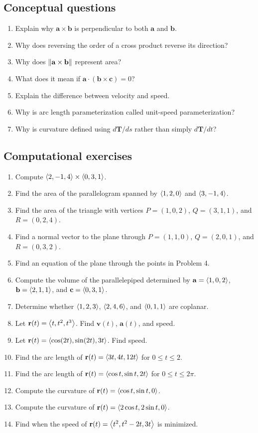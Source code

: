 \subsection*{Conceptual questions}
\begin{enumerate}
\item Explain why $\mathbf a\times\mathbf b$ is perpendicular to both $\mathbf a$ and $\mathbf b$.
\item Why does reversing the order of a cross product reverse its direction?
\item Why does $\left\lVert \mathbf a\times\mathbf b\right\rVert$ represent area?
\item What does it mean if $\mathbf a\cdot(\mathbf b\times\mathbf c)=0$?
\item Explain the difference between velocity and speed.
\item Why is arc length parameterization called unit-speed parameterization?
\item Why is curvature defined using $d\mathbf T/ds$ rather than simply $d\mathbf T/dt$?
\end{enumerate}

\subsection*{Computational exercises}
\begin{enumerate}
\item Compute $\left\langle 2,-1,4\right\rangle\times\left\langle 0,3,1\right\rangle$.
\item Find the area of the parallelogram spanned by $\left\langle 1,2,0\right\rangle$ and $\left\langle 3,-1,4\right\rangle$.
\item Find the area of the triangle with vertices $P=(1,0,2)$, $Q=(3,1,1)$, and $R=(0,2,4)$.
\item Find a normal vector to the plane through $P=(1,1,0)$, $Q=(2,0,1)$, and $R=(0,3,2)$.
\item Find an equation of the plane through the points in Problem 4.
\item Compute the volume of the parallelepiped determined by $\mathbf a=\left\langle 1,0,2\right\rangle$, $\mathbf b=\left\langle 2,1,1\right\rangle$, and $\mathbf c=\left\langle 0,3,1\right\rangle$.
\item Determine whether $\left\langle 1,2,3\right\rangle$, $\left\langle 2,4,6\right\rangle$, and $\left\langle 0,1,1\right\rangle$ are coplanar.
\item Let $\mathbf r(t)=\left\langle t,t^2,t^3\right\rangle$. Find $\mathbf v(t)$, $\mathbf a(t)$, and speed.
\item Let $\mathbf r(t)=\left\langle \cos(2t),\sin(2t),3t\right\rangle$. Find speed.
\item Find the arc length of $\mathbf r(t)=\left\langle 3t,4t,12t\right\rangle$ for $0\le t\le 2$.
\item Find the arc length of $\mathbf r(t)=\left\langle \cos t,\sin t,2t\right\rangle$ for $0\le t\le 2\pi$.
\item Compute the curvature of $\mathbf r(t)=\left\langle \cos t,\sin t,0\right\rangle$.
\item Compute the curvature of $\mathbf r(t)=\left\langle 2\cos t,2\sin t,0\right\rangle$.
\item Find when the speed of $\mathbf r(t)=\left\langle t^2,t^2-2t,3t\right\rangle$ is minimized.
\end{enumerate}

